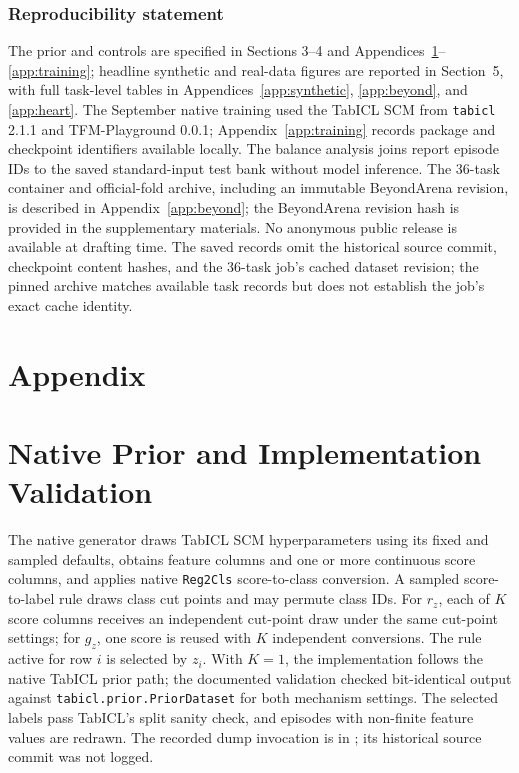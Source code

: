 \documentclass{article}
\begin{document}
\subsubsection*{Reproducibility statement}
The prior and controls are specified in Sections 3--4 and Appendices~\ref{app:prior}--\ref{app:training}; headline synthetic and real-data figures are reported in Section~5, with full task-level tables in Appendices~\ref{app:synthetic}, \ref{app:beyond}, and \ref{app:heart}. The September native training used the TabICL SCM from \texttt{tabicl} 2.1.1 and TFM-Playground 0.0.1; Appendix~\ref{app:training} records package and checkpoint identifiers available locally. The balance analysis joins report episode IDs to the saved standard-input test bank without model inference. The 36-task container and official-fold archive, including an immutable BeyondArena revision, is described in Appendix~\ref{app:beyond}; the BeyondArena revision hash is provided in the supplementary materials. No anonymous public release is available at drafting time. The saved records omit the historical source commit, checkpoint content hashes, and the 36-task job's cached dataset revision; the pinned archive matches available task records but does not establish the job's exact cache identity.



\clearpage\appendix
\section*{Appendix}

\section{Native Prior and Implementation Validation}\label{app:prior}
The native generator draws TabICL SCM hyperparameters using its fixed and sampled defaults, obtains feature columns and one or more continuous score columns, and applies native \texttt{Reg2Cls} score-to-class conversion. A sampled score-to-label rule draws class cut points and may permute class IDs. For $r_z$, each of $K$ score columns receives an independent cut-point draw under the same cut-point settings; for $g_z$, one score is reused with $K$ independent conversions. The rule active for row $i$ is selected by $z_i$. With $K=1$, the implementation follows the native TabICL prior path; the documented validation checked bit-identical output against \texttt{tabicl.prior.PriorDataset} for both mechanism settings. The selected labels pass TabICL's split sanity check, and episodes with non-finite feature values are redrawn. The recorded dump invocation is in ; its historical source commit was not logged.
\end{document}
